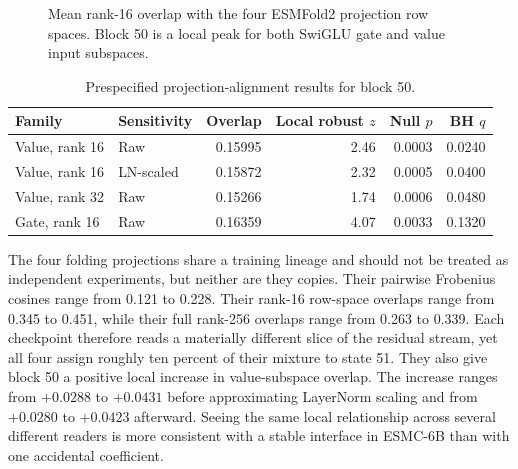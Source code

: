 \documentclass[11pt]{article}
\newcommand{\ESMC}{ESMC-6B\xspace}
\newcommand{\ESMFold}{ESMFold2\xspace}
\begin{document}
\begin{figure}[H]
\centering
{}
\caption{Mean rank-16 overlap with the four \ESMFold projection row spaces. Block 50 is a local peak for both SwiGLU gate and value input subspaces.}
\label{fig:projection}
\end{figure}

\begin{table}[H]
\centering
\caption{Prespecified projection-alignment results for block 50.}
\label{tab:projection}
\begin{tabular}{@{}llrrrr@{}}
\toprule
Family & Sensitivity & Overlap & Local robust $z$ & Null $p$ & BH $q$ \\
\midrule
Value, rank 16 & Raw & 0.15995 & 2.46 & 0.0003 & 0.0240 \\
Value, rank 16 & LN-scaled & 0.15872 & 2.32 & 0.0005 & 0.0400 \\
Value, rank 32 & Raw & 0.15266 & 1.74 & 0.0006 & 0.0480 \\
Gate, rank 16 & Raw & 0.16359 & 4.07 & 0.0033 & 0.1320 \\
\bottomrule
\end{tabular}
\end{table}

The four folding projections share a training lineage and should not be treated as independent experiments, but neither are they copies. Their pairwise Frobenius cosines range from 0.121 to 0.228. Their rank-16 row-space overlaps range from 0.345 to 0.451, while their full rank-256 overlaps range from 0.263 to 0.339. Each checkpoint therefore reads a materially different slice of the residual stream, yet all four assign roughly ten percent of their mixture to state 51. They also give block 50 a positive local increase in value-subspace overlap. The increase ranges from $+0.0288$ to $+0.0431$ before approximating LayerNorm scaling and from $+0.0280$ to $+0.0423$ afterward. Seeing the same local relationship across several different readers is more consistent with a stable interface in \ESMC than with one accidental coefficient.
\end{document}
